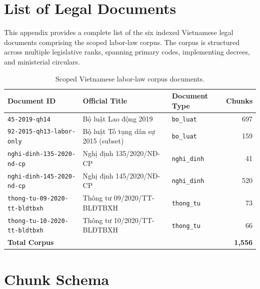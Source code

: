 \chapter{List of Legal Documents}
\label{app:legal-documents}

This appendix provides a complete list of the six indexed Vietnamese legal documents comprising the scoped labor-law corpus. The corpus is structured across multiple legislative ranks, spanning primary codes, implementing decrees, and ministerial circulars.

\begin{table}[H]
  \centering
  \caption{Scoped Vietnamese labor-law corpus documents.}
  \label{tab:app-corpus-documents}
  \scriptsize
  \begin{tabularx}{\linewidth}{>{\raggedright\arraybackslash}X >{\raggedright\arraybackslash}X l r}
    \toprule
    Document ID & Official Title & Document Type & Chunks \\
    \midrule
    \texttt{45-\allowbreak{}2019-\allowbreak{}qh14} & Bộ luật Lao động 2019 & \texttt{bo\_luat} & 697 \\
    \texttt{92-\allowbreak{}2015-\allowbreak{}qh13-\allowbreak{}labor-\allowbreak{}only} & Bộ luật Tố tụng dân sự 2015 (subset) & \texttt{bo\_luat} & 159 \\
    \texttt{nghi-\allowbreak{}dinh-\allowbreak{}135-\allowbreak{}2020-\allowbreak{}nd-\allowbreak{}cp} & Nghị định 135/2020/NĐ-CP & \texttt{nghi\_dinh} & 41 \\
    \texttt{nghi-\allowbreak{}dinh-\allowbreak{}145-\allowbreak{}2020-\allowbreak{}nd-\allowbreak{}cp} & Nghị định 145/2020/NĐ-CP & \texttt{nghi\_dinh} & 520 \\
    \texttt{thong-\allowbreak{}tu-\allowbreak{}09-\allowbreak{}2020-\allowbreak{}tt-\allowbreak{}bldtbxh} & Thông tư 09/2020/TT-BLĐTBXH & \texttt{thong\_tu} & 73 \\
    \texttt{thong-\allowbreak{}tu-\allowbreak{}10-\allowbreak{}2020-\allowbreak{}tt-\allowbreak{}bldtbxh} & Thông tư 10/2020/TT-BLĐTBXH & \texttt{thong\_tu} & 66 \\
    \midrule
    \textbf{Total Corpus} & & & \textbf{1,556} \\
    \bottomrule
  \end{tabularx}
\end{table}

\chapter{Chunk Schema}
\label{app:chunk-schema}

